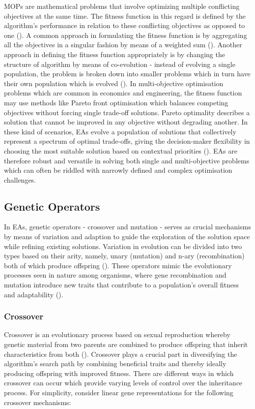 \noindent MOPs are mathematical problems that involve optimizing multiple conflicting objectives at the same time. The fitness function in this regard is defined by the algorithm's performance in relation to these conflicting objectives as opposed to one (\cite{okramergeneticalgorithms}). A common approach in formulating the fitness function is by aggregating all the objectives in a singular fashion by means of a weighted sum (\cite{okramergeneticalgorithms}). Another approach in defining the fitness function appropriately is by changing the structure of algorithm by means of co-evolution - instead of evolving a single population, the problem is broken down into smaller problems which in turn have their own population which is evolved (\cite{ZHOU201132}). In multi-objective optimisation problems which are common in economics and engineering, the fitness function may use methods like Pareto front optimisation which balances competing objectives without forcing single trade-off solutions. Pareto optimality describes a solution that cannot be improved in any objective without degrading another. In these kind of scenarios, EAs evolve a population of solutions that collectively represent a spectrum of optimal trade-offs, giving the decision-maker flexibility in choosing the most suitable solution based on contextual priorities (\cite{rachmawati2009multiobjective}). EAs are therefore robust and versatile in solving both single and multi-objective problems which can often be riddled with narrowly defined and complex optimisation challenges.

\subsection{Genetic Operators}\label{label:ea_genetic_operators}
In EAs, genetic operators - crossover and mutation - serves as crucial mechanisms by means of variation and adaption to guide the exploration of the solution space while refining existing solutions. Variation in evolution can be divided into two types based on their arity, namely, unary (mutation) and n-ary (recombination) both of which produce offspring (\cite{book_introduction_to_evolutionary_computing}). These operators mimic the evolutionary processes seen in nature among organisms, where gene recombination and mutation introduce new traits that contribute to a population's overall fitness and adaptability (\cite{handsOnGeneticAlgorithms}). \bigskip

\subsubsection{Crossover}
Crossover is an evolutionary process based on sexual reproduction whereby genetic material from two parents are combined to produce offspring that inherit characteristics from both (\cite{okramergeneticalgorithms}). Crossover plays a crucial part in diversifying the algorithm's search path by combining beneficial traits and thereby ideally producing offspring with improved fitness. There are different ways in which crossover can occur which provide varying levels of control over the inheritance process. For simplicity, consider linear gene representations for the following crossover mechanisms:

